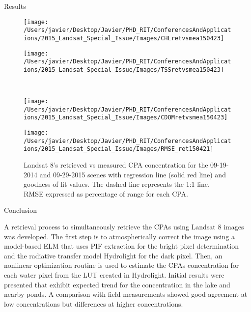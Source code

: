 \documentclass[mathserif]{beamer}
\begin{document}
\begin{frame}{}
\begin{columns}[t]
\begin{column}{.3\linewidth}
\begin{block}{Results}
\begin{figure}[htb]
  \begin{minipage}[c]{0.32\linewidth}
      \texttt{[image: /Users/javier/Desktop/Javier/PHD\_RIT/ConferencesAndApplications/2015\_Landsat\_Special\_Issue/Images/CHLretvsmea150423]}  
  \end{minipage}
  \hspace{1cm}
  \begin{minipage}[d]{0.32\linewidth}
      \texttt{[image: /Users/javier/Desktop/Javier/PHD\_RIT/ConferencesAndApplications/2015\_Landsat\_Special\_Issue/Images/TSSretvsmea150423]}
  \end{minipage}\\
  \begin{minipage}[c]{0.32\linewidth}
      \texttt{[image: /Users/javier/Desktop/Javier/PHD\_RIT/ConferencesAndApplications/2015\_Landsat\_Special\_Issue/Images/CDOMretvsmea150423]}  
  \end{minipage}
  \hspace{1cm}
  \begin{minipage}[c]{0.32\linewidth}
      \texttt{[image: /Users/javier/Desktop/Javier/PHD\_RIT/ConferencesAndApplications/2015\_Landsat\_Special\_Issue/Images/RMSE\_ret150421]}
  \end{minipage}

  \caption{Landsat 8's retrieved vs measured CPA concentration for the 09-19-2014 and 09-29-2015 scenes with regression line (solid red line) and goodness of fit values. The dashed line represents the 1:1 line. RMSE expressed as percentage of range for each CPA. \label{fig:CPAsRetVSMea} } 
\end{figure}        


\end{block}  


\begin{block}{Conclusion}
	
\justifying\small A retrieval process to simultaneously retrieve the CPAs using Landsat 8 images was developed. The first step is to atmospherically correct the image using a model-based ELM that uses PIF extraction for the bright pixel determination and the radiative transfer model Hydrolight for the dark pixel. Then, an nonlinear optimization routine is used to estimate the CPAs concentration for each water pixel from the LUT created in Hydrolight. Initial results were presented that exhibit expected trend for the concentration in the lake and nearby ponds. A comparison with field measurements showed good agreement at low concentrations but differences at higher concentrations.
\vspace{.3cm}
\end{block}



\end{column}
\end{columns}
\end{frame}
\end{document}
